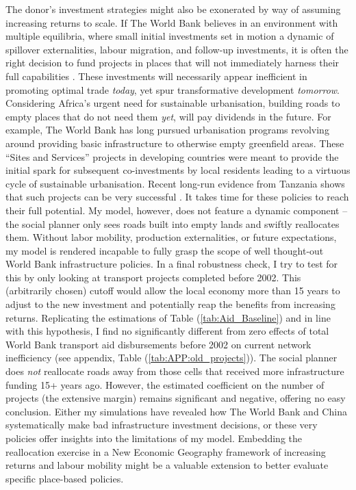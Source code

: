 \documentclass[11pt, oneside]{article}   	%
\let\oldref\ref
\renewcommand{\ref}[1]{(\oldref{#1})}
\begin{document}
The donor's investment strategies might also be exonerated by way of assuming increasing returns to scale. If The World Bank believes in an environment with multiple equilibria, where small initial investments set in motion a dynamic of spillover externalities, labour migration, and follow-up investments, it is often the right decision to fund projects in places that will not immediately harness their full capabilities \citep{Krugman_HistoryExpectations_1991,Krugman_IncreasingReturnsEconomic_1991,Krugman_UrbanConcentrationRole_1996,Fujita_spatialeconomycities_1999,Duranton_PlaceBasedPoliciesDevelopment_2017}. These investments will necessarily appear inefficient in promoting optimal trade \emph{today}, yet spur transformative development \emph{tomorrow}. Considering Africa's urgent need for sustainable urbanisation, building roads to empty places that do not need them \emph{yet}, will pay dividends in the future. For example, The World Bank has long pursued urbanisation programs revolving around providing basic infrastructure to otherwise empty greenfield areas. These ``Sites and Services'' projects in developing countries were meant to provide the initial spark for subsequent co-investments by local residents leading to a virtuous cycle of sustainable urbanisation. Recent long-run evidence from Tanzania shows that such projects can be very successful \citep{Michaels_PlanningAheadBetter_2018}. It takes time for these policies to reach their full potential. My model, however, does not feature a dynamic component -- the social planner only sees roads built into empty lands and swiftly reallocates them. Without labor mobility, production externalities, or future expectations, my model is rendered incapable to fully grasp the scope of well thought-out World Bank infrastructure policies. In a final robustness check, I try to test for this by only looking at transport projects completed before 2002. This (arbitrarily chosen) cutoff would allow the local economy more than 15 years to adjust to the new investment and potentially reap the benefits from increasing returns. Replicating the estimations of Table \ref{tab:Aid_Baseline} and in line with this hypothesis, I find no significantly different from zero effects of total World Bank transport aid disbursements before 2002 on current network inefficiency (see appendix, Table \ref{tab:APP:old_projects}). The social planner does \emph{not} reallocate roads away from those cells that received more infrastructure funding 15+ years ago. However, the estimated coefficient on the number of projects (the extensive margin) remains significant and negative, offering no easy conclusion. Either my simulations have revealed how The World Bank and China systematically make bad infrastructure investment decisions, or these very policies offer insights into the limitations of my model. Embedding the reallocation exercise in a New Economic Geography framework of increasing returns and labour mobility might be a valuable extension to better evaluate specific place-based policies.
\end{document}
